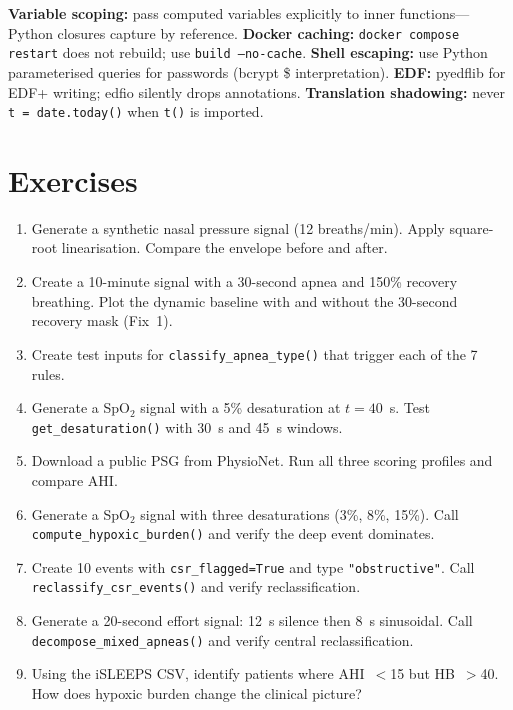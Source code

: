 \documentclass[11pt,a4paper]{article}
\begin{document}
\textbf{Variable scoping:} pass computed variables explicitly to inner
functions---Python closures capture by reference.
\textbf{Docker caching:} \texttt{docker compose restart} does not
rebuild; use \texttt{build --no-cache}.
\textbf{Shell escaping:} use Python parameterised queries for
passwords (bcrypt \$ interpretation).
\textbf{EDF:} pyedflib for EDF+ writing; edfio silently drops
annotations.
\textbf{Translation shadowing:} never \texttt{t = date.today()} when
\texttt{t()} is imported.

\section{Exercises}

\begin{enumerate}
  \item Generate a synthetic nasal pressure signal (12 breaths/min).
    Apply square-root linearisation. Compare the envelope before and
    after.
  \item Create a 10-minute signal with a 30-second apnea and 150\%
    recovery breathing. Plot the dynamic baseline with and without
    the 30-second recovery mask (Fix~1).
  \item Create test inputs for \texttt{classify\_apnea\_type()} that
    trigger each of the 7 rules.
  \item Generate a SpO$_2$ signal with a 5\% desaturation at $t=40$~s.
    Test \texttt{get\_desaturation()} with 30~s and 45~s windows.
  \item Download a public PSG from PhysioNet. Run all three scoring
    profiles and compare AHI.
  \item Generate a SpO$_2$ signal with three desaturations (3\%, 8\%,
    15\%). Call \texttt{compute\_hypoxic\_burden()} and verify the deep
    event dominates.
  \item Create 10 events with \texttt{csr\_flagged=True} and type
    \texttt{"obstructive"}. Call \texttt{reclassify\_csr\_events()} and
    verify reclassification.
  \item Generate a 20-second effort signal: 12~s silence then 8~s
    sinusoidal. Call \texttt{decompose\_mixed\_apneas()} and verify
    central reclassification.
  \item Using the iSLEEPS CSV, identify patients where AHI~$<$15 but
    HB~$>$40. How does hypoxic burden change the clinical picture?
\end{enumerate}
\end{document}
